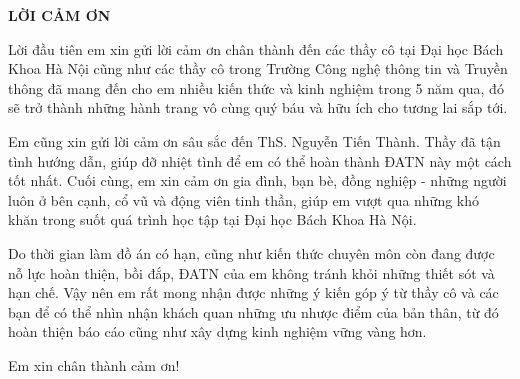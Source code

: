 \documentclass[../DoAn.tex]{subfiles}
\begin{document}
\begin{center}
    \Large{\textbf{LỜI CẢM ƠN}}\\
\end{center}
\vspace{1cm}

Lời đầu tiên em xin gửi lời cảm ơn chân thành đến các thầy cô tại Đại học Bách Khoa Hà Nội cũng như các thầy cô trong Trường Công nghệ thông tin và Truyền thông đã mang đến cho em nhiều kiến thức và kinh nghiệm trong 5 năm qua, đó sẽ trở thành những hành trang vô cùng quý báu và hữu ích cho tương lai sắp tới.

Em cũng xin gửi lời cảm ơn sâu sắc đến ThS. Nguyễn Tiến Thành. Thầy đã tận tình hướng dẫn, giúp đỡ nhiệt tình để em có thể hoàn thành ĐATN này một cách tốt nhất.
Cuối cùng, em xin cảm ơn gia đình, bạn bè, đồng nghiệp - những người luôn ở bên cạnh, cổ vũ và động viên tinh thần, giúp em vượt qua những khó khăn trong suốt quá trình học tập tại Đại học Bách Khoa Hà Nội.

Do thời gian làm đồ án có hạn, cũng như kiến thức chuyên môn còn đang được nỗ lực hoàn thiện, bồi đắp, ĐATN của em không tránh khỏi những thiết sót và hạn chế. Vậy nên em rất mong nhận được những ý kiến góp ý từ thầy cô và các bạn để có thể nhìn nhận khách quan những ưu nhược điểm của bản thân, từ đó hoàn thiện báo cáo cũng như xây dựng kinh nghiệm vững vàng hơn.

Em xin chân thành cảm ơn!
\end{document}

